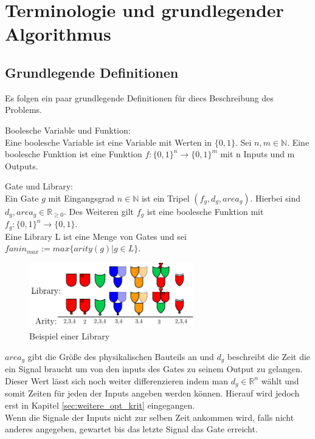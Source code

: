 \documentclass[11pt, a4paper, german]{article}
\begin{document}
\newpage

\section{Terminologie und grundlegender Algorithmus}
\label{sec:terminologie&grundl}
\subsection{Grundlegende Definitionen}
\label{subsec:grundlegende_definitionen}
Es folgen ein paar grundlegende Definitionen für diecs Beschreibung des Problems.

\begin{definition}{Boolesche Variable und Funktion: } \\
Eine boolesche Variable ist eine Variable mit Werten in $ \{ 0 , 1 \} $.
Sei $ n, m \in \mathbb{N}$. Eine boolesche Funktion ist eine Funktion $ f : \{ 0 , 1 \}^n \rightarrow \{ 0 , 1 \}^m $ mit n Inputs und m Outputs. 
\end{definition}

\begin{definition}{Gate und Library:}\label{def:gate}\\
Ein Gate $g$ mit Eingangsgrad $ n \in \mathbb{N}$ ist ein Tripel $(f_g, d_g, area_g)$. Hierbei sind $d_g, area_g \in \mathbb{R}_{\geq 0}$. Des Weiteren gilt $f_g$ ist eine boolesche Funktion mit $ f_g : \{0,1\}^n \rightarrow \{0, 1\} $. \\
Eine Library L ist eine Menge von Gates und sei \\ 
$fanin_{max} := max\{ arity(g) | g \in L \}$.
\end{definition}
\begin{figure}[h]
\begin{center}
 \includegraphics[height = 80pt]{./pictures/compiled/new_library.pdf}
 \caption{Beispiel einer Library}
 \label{bild:new_library}
\end{center}
\end{figure}
$area_g$ gibt die Größe des physikalischen Bauteils an und $d_g$ beschreibt die Zeit die ein Signal braucht um von den inputs des Gates zu seinem Output zu gelangen. Dieser Wert lässt sich noch weiter differenzieren indem man $d_g \in \mathbb{R}^n$ wählt und somit Zeiten für jeden der Inputs angeben werden können. Hierauf wird jedoch erst in Kapitel \ref{sec:weitere_opt_krit} eingegangen. \\
Wenn die Signale der Inputs nicht zur selben Zeit ankommen wird, falls nicht anderes angegeben, gewartet bis das letzte Signal das Gate erreicht.
\end{document}
